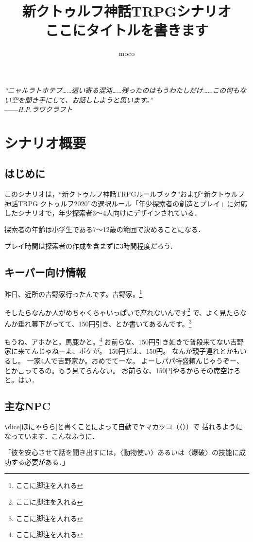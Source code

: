\documentclass[twocolumn, lualatex, ja=standard]{bxjsarticle}
\title{新クトゥルフ神話TRPGシナリオ\\
ここにタイトルを書きます}
\author{moco}
\date{}
\newcommand{\dice}[1][目星]{〈#1〉}
\begin{document}
\maketitle %
\textit{``ニャルラトホテプ……這い寄る混沌……残ったのはもうわたしだけ……この何もない空を聞き手にして、お話ししようと思います。''\\――H.P.ラヴクラフト}

\tableofcontents %

\section{シナリオ概要}
\subsection{はじめに}
このシナリオは，``新クトゥルフ神話TRPGルールブック''および``新クトゥルフ神話TRPG クトゥルフ2020''の選択ルール「年少探索者の創造とプレイ」に対応したシナリオで，年少探索者3〜4人向けにデザインされている．

探索者の年齢は小学生である7〜12歳の範囲で決めることになる．

プレイ時間は探索者の作成を含まずに3時間程度だろう．

\subsection{キーパー向け情報}
昨日、近所の吉野家行ったんです。吉野家。\footnote{ここに脚注を入れる}

そしたらなんか人がめちゃくちゃいっぱいで座れないんです\footnote{ここに脚注を入れる}
で、よく見たらなんか垂れ幕下がってて、150円引き、とか書いてあるんです。\footnote{ここに脚注を入れる}

もうね、アホかと。馬鹿かと。\footnote{ここに脚注を入れる}
お前らな、150円引き如きで普段来てない吉野家に来てんじゃねーよ、ボケが。
150円だよ、150円。
なんか親子連れとかもいるし。
一家4人で吉野家か。おめでてーな。
よーしパパ特盛頼んじゃうぞー、とか言ってるの。もう見てらんない。
お前らな、150円やるからその席空けろと。はい．

\subsection{主なNPC}

\verb|\|dice[ほにゃらら]と書くことによって自動でヤマカッコ（〈〉）で
括れるようになっています．こんなふうに．

「彼を安心させて話を聞き出すには，\dice[動物使い]あるいは\dice[爆破]の技能に成功する必要がある．」
\end{document}
